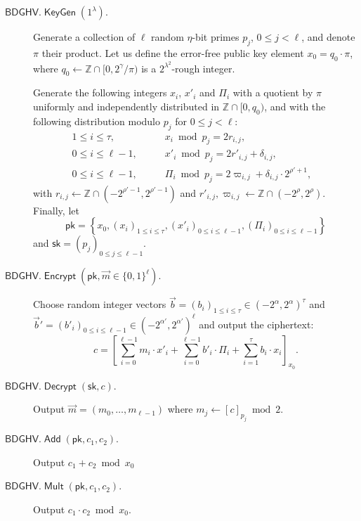 \documentclass[11pt]{llncs}
\renewcommand\leq\leqslant
\newcommand{\Z}{{\mathbb Z}}
\DeclareMathOperator{\KeyGen}{\ensuremath{\mathsf{KeyGen}}}
\DeclareMathOperator{\Encrypt}{\ensuremath{\mathsf{Encrypt}}}
\DeclareMathOperator{\Decrypt}{\ensuremath{\mathsf{Decrypt}}}
\DeclareMathOperator{\Add}{\ensuremath{\mathsf{Add}}}
\DeclareMathOperator{\Mult}{\ensuremath{\mathsf{Mult}}}
\newcommand*{\pk}{\ensuremath{\mathsf{pk}}}
\newcommand*{\sk}{\ensuremath{\mathsf{sk}}}
\newcommand*{\BDGHV}{\ensuremath{\mathsf{BDGHV}}}
\begin{document}
\begin{description}
\item[$\BDGHV.\KeyGen(1^\lambda)$.] Generate a collection of $\ell$
random $\eta$-bit primes $p_j$, $0\leq j<\ell$, and denote $\pi$
their product. Let us define the error-free public key element
$x_0=q_0\cdot\pi$, where $q_0 \leftarrow \Z \cap [0,2^{\gamma}/\pi)$
  is a $2^{\lambda^2}$-rough integer.

  Generate the following integers $x_i$, $x'_i$ and $\varPi_i$ with a quotient by $\pi$ uniformly
  and independently distributed in $\Z\cap [0, q_0)$, and with the
    following distribution modulo $p_j$ for $0 \leq j < \ell$:
$$
\begin{array}{lll}
1 \leq i \leq \tau, & \qquad x_i\bmod p_j = 2r_{i,j},& \\[.2cm]

0\leq i\leq \ell-1, & \qquad x'_i\bmod p_j = 2r'_{i,j}+\delta_{i,j},& \\[.2cm]

0\leq i\leq \ell-1, & \qquad \varPi_i \bmod p_j = 2\varpi_{i,j} +
\delta_{i,j}\cdot 2^{\rho'+1},
\end{array}
$$
with $r_{i,j}\leftarrow\Z\cap(-2^{\rho'-1}, 2^{\rho'-1})$ and $r'_{i,j}, \varpi_{i,j}\leftarrow\Z\cap(-2^{\rho}, 2^{\rho})$. Finally, let 
$$\pk = \left\{ x_0, \left(x_i\right)_{1\leq i\leq \tau}, \left(x'_i\right)_{0\leq i\leq \ell-1}, \left(\varPi_i\right)_{0\leq i\leq {\ell-1}}\right\}$$
and $\sk=(p_j)_{0\leq j\leq {\ell-1}}$.

\item[$\BDGHV.\Encrypt(\pk, \vec{m} \in \{0,1\}^\ell)$.] Choose 
  random integer vectors $\vec b=(b_i)_{1\leq i\leq \tau}
  \in(-2^\alpha,2^{\alpha})^\tau$ and $\vec b'=(b'_i)_{0\leq i\leq
      \ell-1} \in(-2^{\alpha'},2^{\alpha'})^{\ell}$ 
and output the ciphertext:
\begin{equation}
\label{eq:encbdghv}
c = \left[\sum\limits_{i=0}^{\ell-1} m_i \cdot x'_i + 
	\sum_{i=0}^{\ell-1} b'_i\cdot \varPi_i  + \sum_{i=1}^\tau 
b_i\cdot x_i\right]_{x_0}.
\end{equation}
\item[$\BDGHV.\Decrypt(\sk, c)$.] Output $\vec{m}=(m_0,\ldots,m_{\ell-1})$ where $m_j \leftarrow [c]_{p_j} \bmod 2$.
\\\vspace{-0.25cm}
\item[$\BDGHV.\Add(\pk, c_1, c_2)$.] Output $c_1+c_2 \bmod x_0$
\\\vspace{-0.25cm}
\item[$\BDGHV.\Mult(\pk, c_1, c_2)$.] Output $c_1 \cdot c_2 \bmod x_0$.
\end{description}
\end{document}

